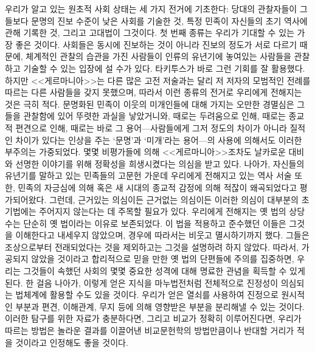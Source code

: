 우리가 알고 있는 원초적 사회 상태는 세 가지 전거에 기초한다:
\hypertarget{contemporary}{당대의}
관찰자들이 그들보다 문명의 진보 수준이 낮은 사회를 기술한 것,
특정 민족이 자신들의 초기 역사에 관해 기록한 것,
그리고 고대법이 그것이다.
첫 번째 종류는 우리가 기대할 수 있는 가장 좋은 것이다.
사회들은 동시에 진보하는 것이 아니라 진보의 정도가 서로 다르기 때문에,
체계적인 관찰의 습관을 가진 사람들이 인류의 유년기에 놓여있는 사람들을
관찰하고 기술할 수 있는 입장에 설 수가 있다.
타키투스가 바로 그런 기회를 잘 활용했다.
하지만 <<게르마니아>>는 다른 많은 고전 저술과는 달리
저 저자의 모범적인 전례를 따르는 다른 사람들을 갖지 못했으며,
따라서 이런 종류의 전거로 우리에게 전해지는 것은 극히 적다.
문명화된 민족이 이웃의 미개인들에 대해 가지는 오만한 경멸심은
그들을 관찰함에 있어 뚜렷한 과실을 낳았거니와,
때로는 두려움으로 인해, 때로는 종교적 편견으로 인해,
때로는 바로 그 용어---사람들에게 그저 정도의 차이가 아니라 질적인 차이가
있다는 인상을 주는 `문명'과 `미개'라는
용어---의 사용에 의해서도
이러한 부주의는 가중되었다.
몇몇 비평가들에 의해
<<게르마니아>>조차도
날카로운 대비와 선명한 이야기를 위해 정확성을 희생시켰다는 의심을 받고 있다.
나아가, 자신들의 유년기를 말하고 있는 민족들의 고문헌 가운데
우리에게 전해지고 있는 역사 서술 또한,
민족의 자긍심에 의해 혹은 새 시대의 종교적 감정에 의해
적잖이 왜곡되었다고 평가되어왔다.
그런데, 근거있는 의심이든 근거없는 의심이든 이러한 의심이
대부분의 초기법에는 주어지지 않는다는 데 주목할 필요가 있다.
우리에게 전해지는 옛 법의 상당수는
단순히 옛 법이라는 이유로 보존되었다.
이 법을 적용하고 준수했던 이들은 그것을 이해한다고 내세우지 않았으며,
경우에 따라서는 비웃고 멸시하기까지 했다.
그들은 조상으로부터 전래되었다는 것을 제외하고는 그것을 설명하려 하지 않았다.
따라서, 가공되지 않았을 것이라고 합리적으로 믿을 만한 옛 법의 단편들에
주의를 집중하면, 우리는 그것들이 속했던 사회의 몇몇 중요한 성격에 대해
명료한 관념을 획득할 수 있게 된다.
한 걸음 나아가, 이렇게 얻은 지식을 마누법전처럼
전체적으로
진정성이
의심되는 법체계에 활용할 수도 있을 것이다.
우리가 얻은 열쇠를 사용하여 진정으로 원시적인 부분과
편견, 이해관계, 무지 등에 의해 영향받은 부분을 분리해낼 수 있는 것이다.
이러한 탐구를 위한 자료가 충분하다면,
그리고 비교가 정확히 이루어진다면,
우리가 따르는 방법은 놀라운 결과를 이끌어낸 비교문헌학의 방법만큼이나
반대할 거리가 적을 것이라고 인정해도 좋을 것이다.

